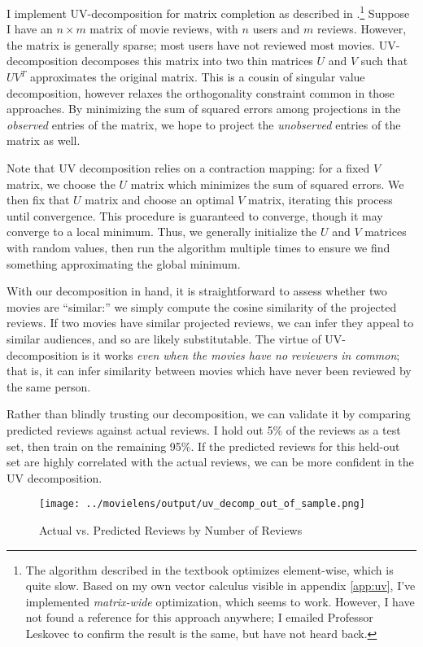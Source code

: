 \documentclass{article}
\begin{document}
I implement UV-decomposition for matrix completion as described in \textcite{leskovec2020MMD}.\footnote{The algorithm described in the textbook optimizes element-wise, which is quite slow. Based on my own vector calculus visible in appendix \ref{app:uv}, I've implemented \emph{matrix-wide} optimization, which seems to work. However, I have not found a reference for this approach anywhere; I emailed Professor Leskovec to confirm the result is the same, but have not heard back.} Suppose I have an $n \times m$ matrix of movie reviews, with $n$ users and $m$ reviews. However, the matrix is generally sparse; most users have not reviewed most movies. UV-decomposition decomposes this matrix into two thin matrices $U$ and $V$ such that $UV^T$ approximates the original matrix. This is a cousin of singular value decomposition, however relaxes the orthogonality constraint common in those approaches. By minimizing the sum of squared errors among projections in the \emph{observed} entries of the matrix, we hope to project the \emph{unobserved} entries of the matrix as well. 

Note that UV decomposition relies on a contraction mapping: for a fixed $V$ matrix, we choose the $U$ matrix which minimizes the sum of squared errors. We then fix that $U$ matrix and choose an optimal $V$ matrix, iterating this process until convergence. This procedure is guaranteed to converge, though it may converge to a local minimum. Thus, we generally initialize the $U$ and $V$ matrices with random values, then run the algorithm multiple times to ensure we find something approximating the global minimum. 

With our decomposition in hand, it is straightforward to assess whether two movies are ``similar:'' we simply compute the cosine similarity of the projected reviews. If two movies have similar projected reviews, we can infer they appeal to similar audiences, and so are likely substitutable. The virtue of UV-decomposition is it works \emph{even when the movies have no reviewers in common}; that is, it can infer similarity between movies which have never been reviewed by the same person.

Rather than blindly trusting our decomposition, we can validate it by comparing predicted reviews against actual reviews. I hold out 5\% of the reviews as a test set, then train on the remaining 95\%. If the predicted reviews for this held-out set are highly correlated with the actual reviews, we can be more confident in the UV decomposition.

\begin{figure}
    \begin{center}
    \texttt{[image: ../movielens/output/uv\_decomp\_out\_of\_sample.png]}
    \caption{Actual vs. Predicted Reviews by Number of Reviews}
    \label{fig:actual_vs_predicted}
    \end{center}
\end{figure}
\end{document}
